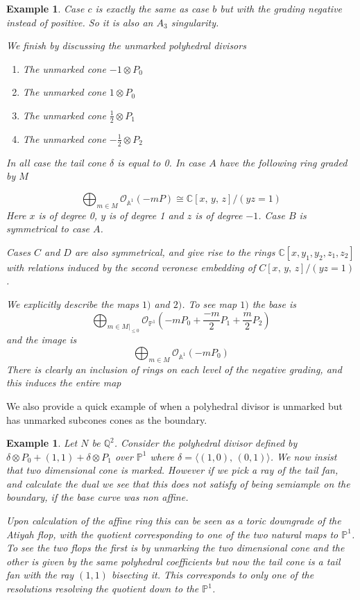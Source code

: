 \documentclass[12pt]{amsart}
\theoremstyle{plain}
\newtheorem{ex}[thm]{Example}
\newcommand{\mb}[1]{\mathbb{#1}}
\begin{document}
\begin{ex}
Case $c$ is exactly the same as case $b$ but with the grading negative instead of positive. So it is also an $A_3$ singularity.


We finish by discussing the unmarked polyhedral divisors

\begin{enumerate}[label =\Alph*)]
\item The unmarked cone $-1 \otimes P_0$
\item The unmarked cone $1 \otimes P_0$
\item The unmarked cone $\frac{1}{2} \otimes P_1$
\item The unmarked cone $-\frac{1}{2} \otimes P_2$
\end{enumerate}

In all case the tail cone $\delta$ is equal to 0. In case $A$ have the following ring graded by $M$

\[
\bigoplus_{m \in M} \mathcal{O}_{\mathbb{A}^1}(-mP) \cong \mathbb{C}[x,\, y, \, z]/(yz = 1)
\]
Here $x$ is of degree 0, $y$ is of degree 1 and $z$ is of degree $-1$. Case $B$ is symmetrical to case $A$. 

Cases $C$ and $D$ are also symmetrical, and give rise to the rings $\mathbb{C}[x, y_1, y_2, z_1, z_2]$ with relations induced by the second veronese embedding of $C[x, \, y, \, z]/(yz = 1)$. 


We explicitly describe the maps $1)$ and $2)$. To see map $1)$ the base is 
\[
\bigoplus_{m \in M|_{\leq 0}} \mathcal{O}_{\mathbb{P}^1} \left(-mP_0 +\frac{-m}{2} P_1 + \frac{m}{2}P_2 \right) 
\]
and the image is 
\[
\bigoplus_{m \in M} \mathcal{O}_{\mathbb{A}^1}(-mP_0)
\]
There is clearly an inclusion of rings on each level of the negative grading, and this induces the entire map
\end{ex}

We also provide a quick example of when a polyhedral divisor is unmarked but has unmarked subcones cones as the boundary. 

\begin{ex}\rm
Let $N$ be $\mb{Q}^2$. Consider the polyhedral divisor defined by $\delta \otimes P_0 + (1, 1) + \delta \otimes P_1$ over $\mathbb{P}^1$ where $\delta = \langle (1,0) , \, (0, 1) \rangle$. We now insist that two dimensional cone is marked. However if we pick a ray of the tail fan, and calculate the dual we see that this does not satisfy of being semiample on the boundary, if the base curve was non affine.

Upon calculation of the affine ring this can be seen as a toric downgrade of the Atiyah flop, with the quotient corresponding to one of the two natural maps to $\mathbb{P}^1$. To see the two flops the first is by unmarking the two dimensional cone and the other is given by the same polyhedral coefficients but now the tail cone is a tail fan with the ray $(1,1)$ bisecting it. This corresponds to only one of the resolutions resolving the quotient down to the $\mathbb{P}^1$.
\end{ex}
\end{document}
